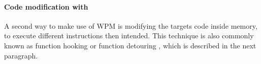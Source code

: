 \paragraph{Code modification with }
A second way to make use of \gls{WPM} is modifying the targets code inside memory, to execute different instructions then intended. This technique is also commonly known as function hooking or function detouring \cite{codeproject_hooking}, which is described in the next paragraph. 